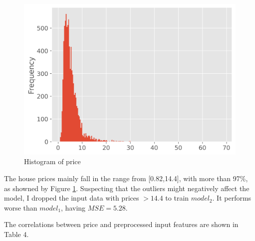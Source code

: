 \documentclass[12pt,article]{article}
\begin{document}
\begin{figure}[H]
    \centering
    \includegraphics[scale=0.6]{price_dist.png} \par
    \caption{Histogram of price}
    \label{fig:price_hist}
\end{figure}

The house prices mainly fall in the range from [0.82,14.4], with more than 97\%, 
as showned by Figure \ref*{fig:price_hist}.
Suspecting that the outliers might negatively affect the model, I dropped the 
input data with prices $> 14.4$ to train $model_2$. It performs worse than 
$model_1$, having $MSE = 5.28$.

\newpage
The correlations between price and preprocessed input features are shown in 
Table 4.
\end{document}
